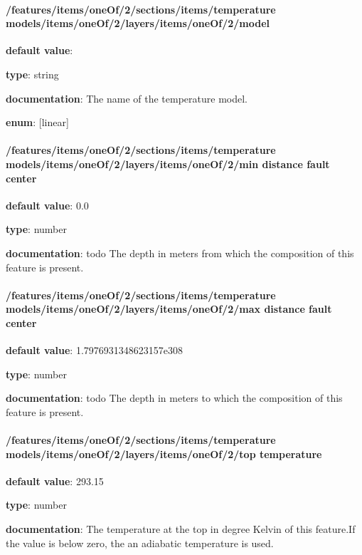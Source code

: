 \paragraph{/features/items/oneOf/2/sections/items/temperature models/items/oneOf/2/layers/items/oneOf/2/model} \begin{itemized}
\item {\bf default value}: 
\item {\bf type}: string
\item {\bf documentation}: The name of the temperature model.
\item {\bf enum}: [linear]\end{itemized}\paragraph{/features/items/oneOf/2/sections/items/temperature models/items/oneOf/2/layers/items/oneOf/2/min distance fault center} \begin{itemized}
\item {\bf default value}: 0.0
\item {\bf type}: number
\item {\bf documentation}: todo The depth in meters from which the composition of this feature is present.
\end{itemized}\paragraph{/features/items/oneOf/2/sections/items/temperature models/items/oneOf/2/layers/items/oneOf/2/max distance fault center} \begin{itemized}
\item {\bf default value}: 1.7976931348623157e308
\item {\bf type}: number
\item {\bf documentation}: todo The depth in meters to which the composition of this feature is present.
\end{itemized}\paragraph{/features/items/oneOf/2/sections/items/temperature models/items/oneOf/2/layers/items/oneOf/2/top temperature} \begin{itemized}
\item {\bf default value}: 293.15
\item {\bf type}: number
\item {\bf documentation}: The temperature at the top in degree Kelvin of this feature.If the value is below zero, the an adiabatic temperature is used.

\end{itemized}
